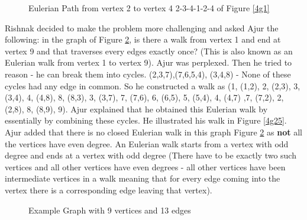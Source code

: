 \begin{figure}
\begin{center}
\caption{ Eulerian Path from vertex 2 to vertex 4 2-3-4-1-2-4 of Figure \ref{4g1}}\label{4g15}
\end{center}
\end{figure}
\vspace{2cm}
Rishnak decided to make the problem more challenging and asked Ajur the following: in the graph of Figure \ref{4g2}, is there a walk from vertex 1 and end at vertex 9 and that traverses every edges exactly once? (This is also known as an Eulerian walk from vertex 1 to vertex 9).
Ajur was perplexed. Then he tried to reason - he can break them into cycles. (2,3,7),(7,6,5,4), (3,4,8)  - None of these cycles had any edge in common. So he constructed a walk as (1, (1,2), 2, (2,3),
3, (3,4), 4, (4,8), 8, (8,3), 3, (3,7), 7, (7,6), 6, (6,5), 5, (5,4), 4, (4,7) ,7,
(7,2), 2, (2,8), 8, (8,9), 9). Ajur explained that he obtained this Eulerian walk by essentially by combining these cycles. He illustrated his walk in Figure \ref{4g25}. Ajur added that there is no closed Eulerian walk in this graph Figure \ref{4g2} as \textbf{not} all the vertices have even degree. An Eulerian walk starts from a vertex with odd degree and ends at a vertex with odd degree (There have to be exactly two such vertices and all other vertices have even degrees - all other vertices have been intermediate vertices in a walk meaning that for every edge coming into the vertex there is a corresponding edge leaving that vertex).

\begin{figure}
\begin{center}
\caption{ Example Graph with 9 vertices and 13 edges}\label{4g2}
\end{center}
\end{figure}

